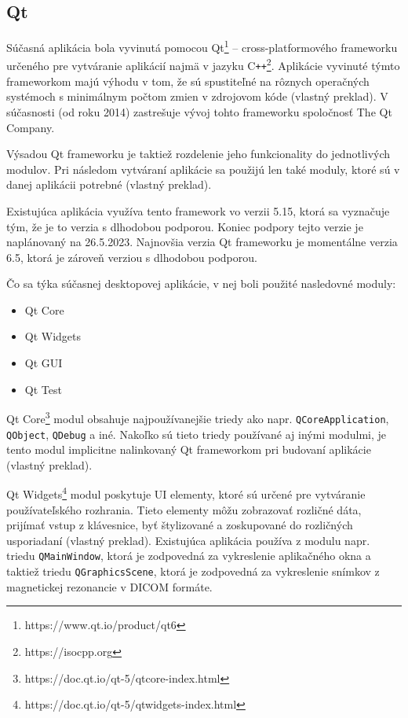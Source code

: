 \subsection {Qt}
Súčasná aplikácia bola vyvinutá pomocou Qt\footnote{https://www.qt.io/product/qt6} -- cross-platformového frameworku určeného pre vytváranie aplikácií najmä v jazyku C\texttt{++}\footnote{https://isocpp.org}. Aplikácie vyvinuté týmto frameworkom majú výhodu v tom, že sú spustiteľné na rôznych operačných systémoch s minimálnym počtom zmien v zdrojovom kóde \cite{qt_description} (vlastný preklad). V súčasnosti (od roku 2014) zastrešuje vývoj tohto frameworku spoločnosť The Qt Company.

Výsadou Qt frameworku je taktiež rozdelenie jeho funkcionality do jednotlivých modulov. Pri následom vytváraní aplikácie sa použijú len také moduly, ktoré sú v danej aplikácii potrebné \cite{qt_description} (vlastný preklad).

Existujúca aplikácia využíva tento framework vo verzii 5.15, ktorá sa vyznačuje tým, že je to verzia s dlhodobou podporou. Koniec podpory tejto verzie je naplánovaný na 26.5.2023. Najnovšia verzia Qt frameworku je momentálne verzia 6.5, ktorá je zároveň verziou s dlhodobou podporou.

Čo sa týka súčasnej desktopovej aplikácie, v nej boli použité nasledovné moduly: 

\begin{itemize}
\item {Qt Core}
\item {Qt Widgets}
\item {Qt GUI}
\item {Qt Test}
\end{itemize}

Qt Core\footnote{https://doc.qt.io/qt-5/qtcore-index.html} modul obsahuje najpoužívanejšie triedy ako napr. \texttt{QCoreApplication}, \texttt{QObject}, \texttt{QDebug} a iné. Nakoľko sú tieto triedy používané aj inými modulmi, je tento modul implicitne nalinkovaný Qt frameworkom pri budovaní aplikácie \cite{qtcore_description} (vlastný preklad). \newline

Qt Widgets\footnote{https://doc.qt.io/qt-5/qtwidgets-index.html} modul poskytuje UI elementy, ktoré sú určené pre vytváranie používateľského rozhrania. Tieto elementy môžu zobrazovať rozličné dáta, prijímať vstup z klávesnice, byť štylizované a zoskupované do rozličných usporiadaní \cite{qtwidgets_description} (vlastný preklad). Existujúca aplikácia používa z modulu napr. triedu \texttt{QMainWindow}, ktorá je zodpovedná za vykreslenie aplikačného okna a taktiež triedu \texttt{QGraphicsScene}, ktorá je zodpovedná za vykreslenie snímkov z magnetickej rezonancie v DICOM formáte. \newline

